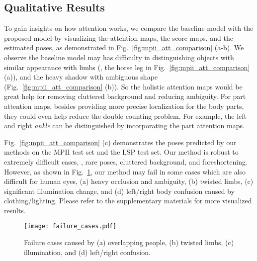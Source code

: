 \documentclass[10pt,twocolumn,letterpaper]{article}
\begin{document}
\subsection{Qualitative Results}
To gain insights on how attention works, we compare the baseline model with the proposed model by visualizing the attention maps, the score maps, and the estimated poses, as demonstrated in Fig.~\ref{fig:mpii_att_comparison} (a-b). 
We observe the baseline model may has difficulty in distinguishing objects with similar appearance with limbs (\eg, the horse leg in Fig.~\ref{fig:mpii_att_comparison} (a)), 
and the heavy shadow with ambiguous shape (Fig.~\ref{fig:mpii_att_comparison} (b)). 
So the holistic attention maps would be great help for removing cluttered background and reducing ambiguity. For part attention maps, besides providing more precise localization for the body parts, they could even help reduce the double counting problem. For example, the left and right \textit{ankle} can be distinguished by incorporating the part attention maps.


Fig.~\ref{fig:mpii_att_comparison} (c) demonstrates the poses predicted by our methods on the MPII test set and the LSP test set. Our method is robust to extremely difficult cases, \eg, rare poses, cluttered background, and foreshortening. 
However, as shown in Fig.~\ref{fig:failure_cases}, our method may fail in some cases which are also difficult for human eyes, \ie (a) heavy occlusion and ambiguity,  (b) twisted limbs,  (c) significant illumination change, and  (d) left/right body confusion caused by clothing/lighting. Please refer to the supplementary materials for more visualized results.








\begin{figure}
  	\begin{center}
	\texttt{[image: failure\_cases.pdf]}
  	\end{center}
  	\vspace{-2em}
    \caption{\small Failure cases caused by (a) overlapping people,  (b) twisted limbs,  (c) illumination, and  (d) left/right confusion.}
      	\vspace{-1.5em}
  	\label{fig:failure_cases}
\end{figure}


\vspace{-0.5em}
\end{document}
